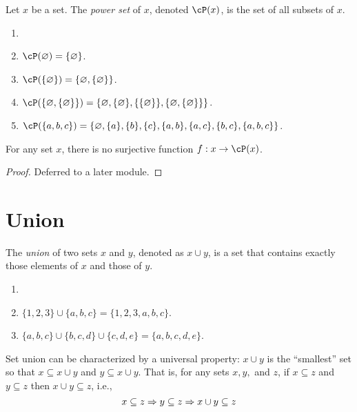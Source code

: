 \documentclass[article,10pt,oneside]{memoir}
\begin{document}
\begin{defn}
  Let $x$ be a set.
  The \emph{power set} of $x$, denoted $\cP(x)$, is the set of all subsets of $x$.
\end{defn}


\begin{eg}\label{eg:subsets}
  \begin{enumerate}
  \item[]
  \item $\cP(\varnothing) = \{\varnothing\}$.
  \item $\cP(\{ \varnothing \}) = \{\varnothing, \{\varnothing\}\}$.
  \item $\cP(\{\varnothing, \{\varnothing\}\}) = \{ \varnothing, \{\varnothing\}, \{\{\varnothing\}\}, \{\varnothing, \{\varnothing\}\} \}$.
  \item $\cP(\{ a,b,c \}) = \{ \varnothing, \{ a \}, \{ b \}, \{ c \}, \{ a,b \}, \{ a,c \}, \{ b,c \}, \{ a,b,c \} \}$.
  \end{enumerate}
\end{eg}

\begin{thm}
  For any set $x$, there is no surjective function $f : x \to \cP(x)$.
\end{thm}
\begin{proof}
  Deferred to a later module.
\end{proof}

\section{Union}
\label{sec:union}

\begin{defn}
  The \emph{union} of two sets $x$ and $y$, denoted as $x \cup y$, is a set that contains exactly those elements of $x$ and those of $y$.
\end{defn}

\begin{eg}
  \begin{enumerate}
  \item[]
  \item $\{1,2,3\} \cup \{a,b,c\} = \{1,2,3,a,b,c\}$.
  \item $\{a,b,c\} \cup \{b,c,d\} \cup \{c,d,e\} = \{a,b,c,d,e\}$.
  \end{enumerate}
\end{eg}

\begin{rmk}
  Set union can be characterized by a universal property: $x \cup y$ is the ``smallest'' set so that $x \subseteq x \cup y$ and $y \subseteq x \cup y$.
  That is, for any sets $x, y,$ and $z$, if $x \subseteq z$ and $y \subseteq z$ then $x \cup y \subseteq z$, i.e.,
  \[
    x \subseteq z \Rightarrow y \subseteq z \Rightarrow x \cup y \subseteq z
  \]
\end{rmk}
\end{document}
